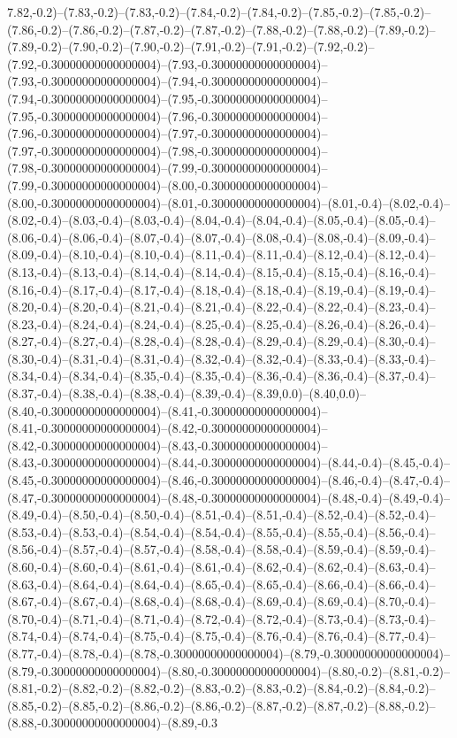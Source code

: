 7.82,-0.2)--(7.83,-0.2)--(7.83,-0.2)--(7.84,-0.2)--(7.84,-0.2)--(7.85,-0.2)--(7.85,-0.2)--(7.86,-0.2)--(7.86,-0.2)--(7.87,-0.2)--(7.87,-0.2)--(7.88,-0.2)--(7.88,-0.2)--(7.89,-0.2)--(7.89,-0.2)--(7.90,-0.2)--(7.90,-0.2)--(7.91,-0.2)--(7.91,-0.2)--(7.92,-0.2)--(7.92,-0.30000000000000004)--(7.93,-0.30000000000000004)--(7.93,-0.30000000000000004)--(7.94,-0.30000000000000004)--(7.94,-0.30000000000000004)--(7.95,-0.30000000000000004)--(7.95,-0.30000000000000004)--(7.96,-0.30000000000000004)--(7.96,-0.30000000000000004)--(7.97,-0.30000000000000004)--(7.97,-0.30000000000000004)--(7.98,-0.30000000000000004)--(7.98,-0.30000000000000004)--(7.99,-0.30000000000000004)--(7.99,-0.30000000000000004)--(8.00,-0.30000000000000004)--(8.00,-0.30000000000000004)--(8.01,-0.30000000000000004)--(8.01,-0.4)--(8.02,-0.4)--(8.02,-0.4)--(8.03,-0.4)--(8.03,-0.4)--(8.04,-0.4)--(8.04,-0.4)--(8.05,-0.4)--(8.05,-0.4)--(8.06,-0.4)--(8.06,-0.4)--(8.07,-0.4)--(8.07,-0.4)--(8.08,-0.4)--(8.08,-0.4)--(8.09,-0.4)--(8.09,-0.4)--(8.10,-0.4)--(8.10,-0.4)--(8.11,-0.4)--(8.11,-0.4)--(8.12,-0.4)--(8.12,-0.4)--(8.13,-0.4)--(8.13,-0.4)--(8.14,-0.4)--(8.14,-0.4)--(8.15,-0.4)--(8.15,-0.4)--(8.16,-0.4)--(8.16,-0.4)--(8.17,-0.4)--(8.17,-0.4)--(8.18,-0.4)--(8.18,-0.4)--(8.19,-0.4)--(8.19,-0.4)--(8.20,-0.4)--(8.20,-0.4)--(8.21,-0.4)--(8.21,-0.4)--(8.22,-0.4)--(8.22,-0.4)--(8.23,-0.4)--(8.23,-0.4)--(8.24,-0.4)--(8.24,-0.4)--(8.25,-0.4)--(8.25,-0.4)--(8.26,-0.4)--(8.26,-0.4)--(8.27,-0.4)--(8.27,-0.4)--(8.28,-0.4)--(8.28,-0.4)--(8.29,-0.4)--(8.29,-0.4)--(8.30,-0.4)--(8.30,-0.4)--(8.31,-0.4)--(8.31,-0.4)--(8.32,-0.4)--(8.32,-0.4)--(8.33,-0.4)--(8.33,-0.4)--(8.34,-0.4)--(8.34,-0.4)--(8.35,-0.4)--(8.35,-0.4)--(8.36,-0.4)--(8.36,-0.4)--(8.37,-0.4)--(8.37,-0.4)--(8.38,-0.4)--(8.38,-0.4)--(8.39,-0.4)--(8.39,0.0)--(8.40,0.0)--(8.40,-0.30000000000000004)--(8.41,-0.30000000000000004)--(8.41,-0.30000000000000004)--(8.42,-0.30000000000000004)--(8.42,-0.30000000000000004)--(8.43,-0.30000000000000004)--(8.43,-0.30000000000000004)--(8.44,-0.30000000000000004)--(8.44,-0.4)--(8.45,-0.4)--(8.45,-0.30000000000000004)--(8.46,-0.30000000000000004)--(8.46,-0.4)--(8.47,-0.4)--(8.47,-0.30000000000000004)--(8.48,-0.30000000000000004)--(8.48,-0.4)--(8.49,-0.4)--(8.49,-0.4)--(8.50,-0.4)--(8.50,-0.4)--(8.51,-0.4)--(8.51,-0.4)--(8.52,-0.4)--(8.52,-0.4)--(8.53,-0.4)--(8.53,-0.4)--(8.54,-0.4)--(8.54,-0.4)--(8.55,-0.4)--(8.55,-0.4)--(8.56,-0.4)--(8.56,-0.4)--(8.57,-0.4)--(8.57,-0.4)--(8.58,-0.4)--(8.58,-0.4)--(8.59,-0.4)--(8.59,-0.4)--(8.60,-0.4)--(8.60,-0.4)--(8.61,-0.4)--(8.61,-0.4)--(8.62,-0.4)--(8.62,-0.4)--(8.63,-0.4)--(8.63,-0.4)--(8.64,-0.4)--(8.64,-0.4)--(8.65,-0.4)--(8.65,-0.4)--(8.66,-0.4)--(8.66,-0.4)--(8.67,-0.4)--(8.67,-0.4)--(8.68,-0.4)--(8.68,-0.4)--(8.69,-0.4)--(8.69,-0.4)--(8.70,-0.4)--(8.70,-0.4)--(8.71,-0.4)--(8.71,-0.4)--(8.72,-0.4)--(8.72,-0.4)--(8.73,-0.4)--(8.73,-0.4)--(8.74,-0.4)--(8.74,-0.4)--(8.75,-0.4)--(8.75,-0.4)--(8.76,-0.4)--(8.76,-0.4)--(8.77,-0.4)--(8.77,-0.4)--(8.78,-0.4)--(8.78,-0.30000000000000004)--(8.79,-0.30000000000000004)--(8.79,-0.30000000000000004)--(8.80,-0.30000000000000004)--(8.80,-0.2)--(8.81,-0.2)--(8.81,-0.2)--(8.82,-0.2)--(8.82,-0.2)--(8.83,-0.2)--(8.83,-0.2)--(8.84,-0.2)--(8.84,-0.2)--(8.85,-0.2)--(8.85,-0.2)--(8.86,-0.2)--(8.86,-0.2)--(8.87,-0.2)--(8.87,-0.2)--(8.88,-0.2)--(8.88,-0.30000000000000004)--(8.89,-0.3
